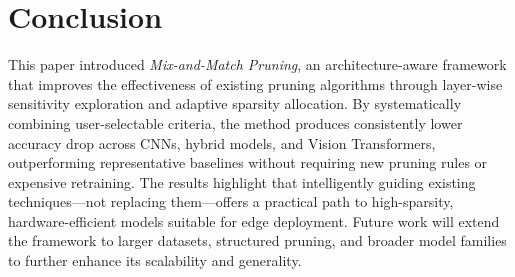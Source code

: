 \documentclass[11pt, conference]{IEEEtran}
\begin{document}
\section{Conclusion}
This paper introduced \textit{Mix-and-Match Pruning}, an architecture-aware framework that improves the effectiveness of existing pruning algorithms through layer-wise sensitivity exploration and adaptive sparsity allocation. By systematically combining user-selectable criteria, the method produces consistently lower accuracy drop across CNNs, hybrid models, and Vision Transformers, outperforming representative baselines without requiring new pruning rules or expensive retraining. The results highlight that intelligently guiding existing techniques—not replacing them—offers a practical path to high-sparsity, hardware-efficient models suitable for edge deployment. Future work will extend the framework to larger datasets, structured pruning, and broader model families to further enhance its scalability and generality.












\end{document}
